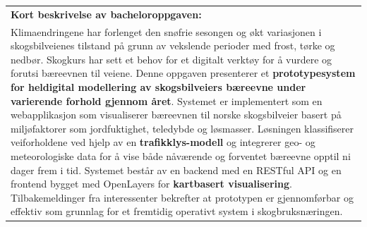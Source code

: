 \begin{table}[ht]
\begin{tabularx}{\textwidth}{|X|X|X|}
    \multicolumn{3}{|l|}{\textbf{Kort beskrivelse av bacheloroppgaven:}} \\
    \multicolumn{3}{|p{0.96\textwidth}|}{
    Klimaendringene har forlenget den snøfrie sesongen og økt variasjonen i skogsbilveienes tilstand på grunn av vekslende perioder med frost, tørke og nedbør. Skogkurs har sett et behov for et digitalt verktøy for å vurdere og forutsi bæreevnen til veiene. Denne oppgaven presenterer et \textbf{prototypesystem for heldigital modellering av skogsbilveiers bæreevne under varierende forhold gjennom året}. Systemet er implementert som en webapplikasjon som visualiserer bæreevnen til norske skogsbilveier basert på miljøfaktorer som jordfuktighet, teledybde og løsmasser. Løsningen klassifiserer veiforholdene ved hjelp av en \textbf{trafikklys-modell} og integrerer geo- og meteorologiske data for å vise både nåværende og forventet bæreevne opptil ni dager frem i tid. Systemet består av en backend med en RESTful API og en frontend bygget med OpenLayers for \textbf{kartbasert visualisering}. Tilbakemeldinger fra interessenter bekrefter at prototypen er gjennomførbar og effektiv som grunnlag for et fremtidig operativt system i skogbruksnæringen.
    } \\ \hline
  \end{tabularx}
\end{table}
